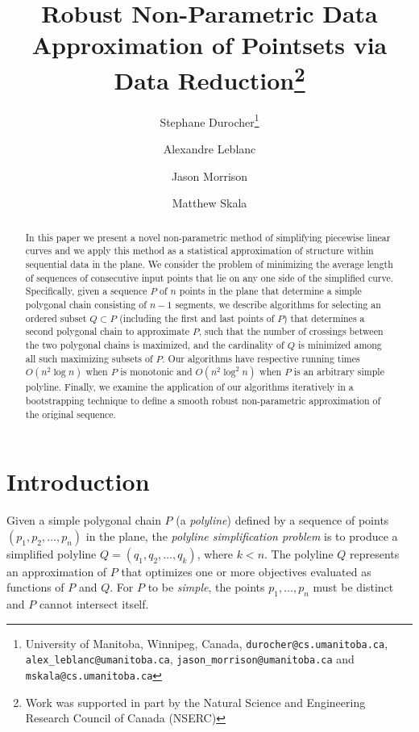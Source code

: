 \documentclass{article}
\begin{document}
\title{Robust Non-Parametric Data Approximation of Pointsets via Data Reduction\thanks{Work was supported in part by the Natural Science and Engineering Research Council of Canada (NSERC)}}

\author{Stephane Durocher\thanks{University of Manitoba, Winnipeg, Canada, {\tt durocher@cs.umanitoba.ca}, {\tt alex\_{}leblanc@umanitoba.ca}, {\tt jason\_{}morrison@umanitoba.ca} and {\tt mskala@cs.umanitoba.ca}} \and Alexandre Leblanc\footnotemark[2] \and Jason Morrison\footnotemark[2] \and Matthew Skala\footnotemark[2]}



\maketitle

\begin{abstract}
In this paper we present a novel non-parametric method of simplifying
piecewise linear curves and we apply this method 
as a statistical approximation of structure within sequential data in the plane.
We consider the problem of minimizing the average length of sequences of
consecutive input points that lie on any one side of the simplified curve.
Specifically, given a sequence $P$ of $n$ points in the plane that determine a 
simple polygonal chain consisting of $n-1$ segments, 
we describe algorithms for selecting an ordered subset $Q \subset P$
(including the first and last points of $P$) that determines a second
polygonal chain to approximate $P$,
such that the number of crossings between the two polygonal chains is maximized,
and the cardinality of $Q$ is minimized among 
all such maximizing subsets of $P$.
Our algorithms have respective running times 
$O(n^2\log n)$ when $P$ is monotonic and
$O(n^2\log^2 n)$ when $P$ is an arbitrary simple polyline.
Finally, we examine the application of our algorithms iteratively in a 
bootstrapping technique to define a smooth robust non-parametric approximation of the original sequence.
\end{abstract}

\section{Introduction}

Given a simple
polygonal chain $P$ (a \emph{polyline}) defined by a sequence of points
$(p_1,p_2,\ldots,p_n)$ in the plane, the \emph{polyline simplification problem} is
to produce a simplified polyline $Q=(q_1,q_2,\dots,q_k)$, where $k < n$.
The polyline $Q$ represents an approximation of $P$
that optimizes one or more objectives evaluated as functions of $P$ and $Q$.
For $P$ to be \emph{simple}, the points $p_1,\ldots,p_n$ must be
distinct and $P$ cannot intersect itself.
\end{document}
